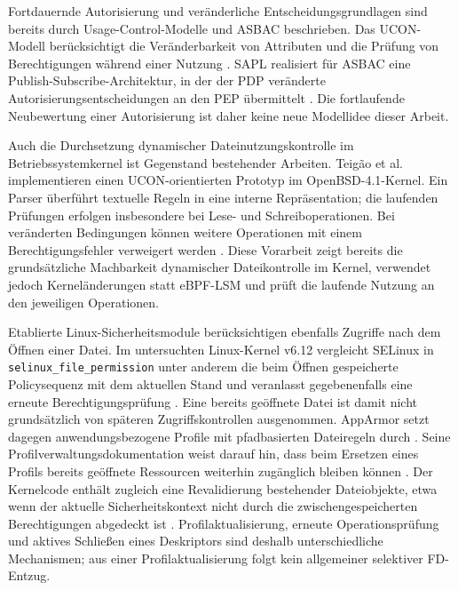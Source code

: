 Fortdauernde Autorisierung und veränderliche Entscheidungsgrundlagen sind bereits durch Usage-Control-Modelle und ASBAC beschrieben.
Das UCON-Modell berücksichtigt die Veränderbarkeit von Attributen und die Prüfung von Berechtigungen während einer Nutzung \citep{park2004ucon}.
SAPL realisiert für ASBAC eine Publish-Subscribe-Architektur, in der der PDP veränderte Autorisierungsentscheidungen an den PEP übermittelt \citep{heutelbeck2021asbac,saplIntroduction30}.
Die fortlaufende Neubewertung einer Autorisierung ist daher keine neue Modellidee dieser Arbeit.

Auch die Durchsetzung dynamischer Dateinutzungskontrolle im Betriebssystemkernel ist Gegenstand bestehender Arbeiten.
Teigão et al. implementieren einen UCON-orientierten Prototyp im OpenBSD-4.1-Kernel.
Ein Parser überführt textuelle Regeln in eine interne Repräsentation; die laufenden Prüfungen erfolgen insbesondere bei Lese- und Schreiboperationen.
Bei veränderten Bedingungen können weitere Operationen mit einem Berechtigungsfehler verweigert werden \citep[Abschnitte~7.1--7.3, S.~1349--1350]{teigao2011usagekernel}.
Diese Vorarbeit zeigt bereits die grundsätzliche Machbarkeit dynamischer Dateikontrolle im Kernel, verwendet jedoch Kerneländerungen statt eBPF-LSM und prüft die laufende Nutzung an den jeweiligen Operationen.

Etablierte Linux-Sicherheitsmodule berücksichtigen ebenfalls Zugriffe nach dem Öffnen einer Datei.
Im untersuchten Linux-Kernel v6.12 vergleicht SELinux in \texttt{selinux\_file\_permission} unter anderem die beim Öffnen gespeicherte Policysequenz mit dem aktuellen Stand und veranlasst gegebenenfalls eine erneute Berechtigungsprüfung \citep{linuxSelinuxRevalidation612}.
Eine bereits geöffnete Datei ist damit nicht grundsätzlich von späteren Zugriffskontrollen ausgenommen.
AppArmor setzt dagegen anwendungsbezogene Profile mit pfadbasierten Dateiregeln durch \citep{kerneldocAppArmor}.
Seine Profilverwaltungsdokumentation weist darauf hin, dass beim Ersetzen eines Profils bereits geöffnete Ressourcen weiterhin zugänglich bleiben können \citep{apparmorManagingProfiles}.
Der Kernelcode enthält zugleich eine Revalidierung bestehender Dateiobjekte, etwa wenn der aktuelle Sicherheitskontext nicht durch die zwischengespeicherten Berechtigungen abgedeckt ist \citep{linuxApparmorRevalidation612}.
Profilaktualisierung, erneute Operationsprüfung und aktives Schließen eines Deskriptors sind deshalb unterschiedliche Mechanismen; aus einer Profilaktualisierung folgt kein allgemeiner selektiver FD-Entzug.

